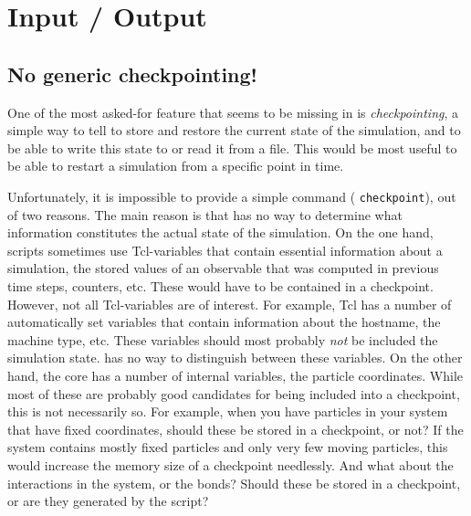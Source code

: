 %  
%   
%  
%  
%
\chapter{Input / Output}
\label{cha:io}

\section{No generic checkpointing!}
\label{sec:checkpointing}

One of the most asked-for feature that seems to be missing in \es is
\emph{checkpointing}, \ie a simple way to tell \es to store and
restore the current state of the simulation, and to be able to write
this state to or read it from a file. This would be most useful to be
able to restart a simulation from a specific point in time.

Unfortunately, it is impossible to provide a simple command (\eg
\texttt{checkpoint}), out of two reasons.  The main reason is that \es
has no way to determine what information constitutes the actual state
of the simulation.  On the one hand, \es scripts sometimes use
Tcl-variables that contain essential information about a simulation,
\eg the stored values of an observable that was computed in previous
time steps, counters, etc.  These would have to be contained in a
checkpoint.  However, not all Tcl-variables are of interest. For
example, Tcl has a number of automatically set variables that contain
information about the hostname, the machine type, etc. These variables
should most probably \emph{not} be included the simulation state.  \es
has no way to distinguish between these variables.  On the other hand,
the \es core has a number of internal variables, \eg the particle
coordinates.  While most of these are probably good candidates for
being included into a checkpoint, this is not necessarily so.  For
example, when you have particles in your system that have fixed
coordinates, should these be stored in a checkpoint, or not?  If the
system contains mostly fixed particles and only very few moving
particles, this would increase the memory size of a checkpoint
needlessly. And what about the interactions in the system, or the
bonds? Should these be stored in a checkpoint, or are they generated
by the script?

